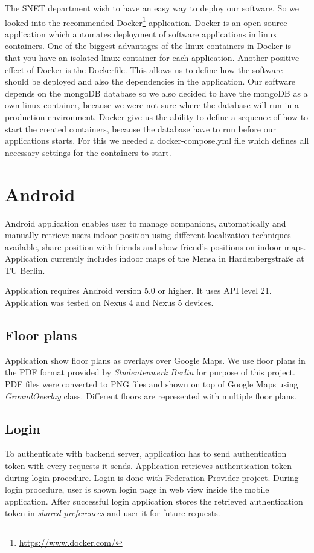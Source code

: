 The SNET department wish to have an easy way to deploy our software. So we looked into the recommended Docker\footnote{\url{https://www.docker.com/}} application. Docker is an open source application which automates deployment of software applications in linux containers. One of the biggest advantages of the linux containers in Docker is that you have an isolated linux container for each application. Another positive effect of Docker is the Dockerfile. This allows us to define how the software should be deployed and also the dependencies in the application. Our software depends on the mongoDB database so we also decided to have the mongoDB as a own linux container, because we were not sure where the database will run in a production environment. Docker give us the ability to define a sequence of how to start the created containers, because the database have to run before our applications starts. For this we needed a docker-compose.yml file which defines all necessary settings for the containers to start.



\vspace{0.5cm}

\section{Android}

Android application enables user to manage companions, automatically and manually retrieve users indoor position using different localization techniques available, share position with friends and show friend's positions on indoor maps. Application currently includes indoor maps of the Mensa in Hardenbergstraße at TU Berlin.

Application requires Android version 5.0 or higher. It uses API level 21. Application was tested on Nexus 4 and Nexus 5 devices.

\subsection{Floor plans}
Application show floor plans as overlays over Google Maps. We use floor plans in the PDF format provided by \textit{Studentenwerk Berlin} for purpose of this project. PDF files were converted to PNG files and shown on top of Google Maps using \textit{GroundOverlay} class. Different floors are represented with multiple floor plans.

\subsection{Login}
To authenticate with backend server, application has to send authentication token with every requests it sends. Application retrieves authentication token during login procedure. Login is done with Federation Provider project. During login procedure, user is shown login page in web view inside the mobile application. After successful login application stores the retrieved authentication token in \textit{shared preferences} and user it for future requests.

